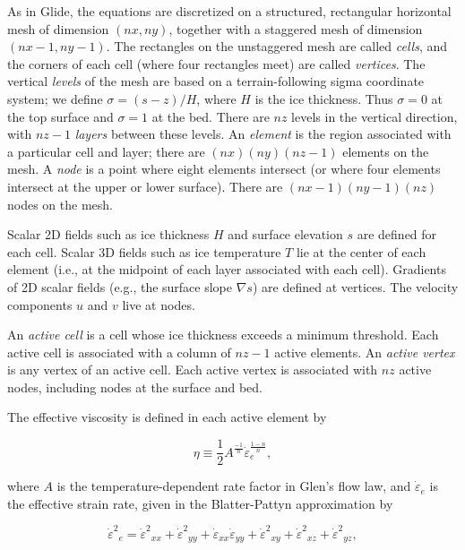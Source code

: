 As in Glide, the equations are discretized on a structured, rectangular horizontal mesh
of dimension $(nx,ny)$, together with a staggered mesh of dimension $(nx-1,ny-1)$.  The rectangles on the unstaggered mesh
are called \textit{cells}, and the corners of each cell (where four rectangles meet) are called \textit{vertices}.
The vertical \textit{levels} of the mesh are based on a terrain-following sigma coordinate system; 
we define $\sigma = (s-z)/H$, where $H$ is the ice thickness. Thus $\sigma = 0$ at the top surface and $\sigma = 1$ at the bed. 
There are $nz$ levels in the vertical direction, with $nz-1$ \textit{layers} between these levels.
An \textit{element} is the region associated with a particular cell and layer; there are
$(nx)(ny)(nz-1)$ elements on the mesh.  A \textit{node} is a point where eight elements intersect (or where four elements
intersect at the upper or lower surface). There are $(nx-1)(ny-1)(nz)$ nodes on the mesh.

Scalar 2D fields such as ice thickness $H$ and surface elevation $s$ are defined for each cell.
Scalar 3D fields such as ice temperature $T$ lie at the center of each element (i.e., at the midpoint of each layer
associated with  each cell). Gradients of 2D scalar fields (e.g., the surface slope $\nabla s$) are defined at vertices.
The velocity components $u$ and $v$ live at nodes.

An \textit{active cell} is a cell whose ice thickness exceeds a minimum threshold.  Each active cell is associated with
a column of $nz-1$ active elements.  An \textit{active vertex} is any vertex of an active cell.  Each active vertex is
associated with $nz$ active nodes, including nodes at the surface and bed.

The effective viscosity is defined in each active element by

\begin{equation}
  \label{gliss.eq.effective_viscosity}
  \eta \equiv \frac{1}{2} A^{\frac{-1}{n}} \dot{\varepsilon }_{e}^{\frac{1-n}{n}},
\end{equation}

\noindent
where $A$ is the temperature-dependent rate factor in Glen's flow law, and $\dot{\varepsilon }_{e}$ is the effective strain rate,
given in the Blatter-Pattyn approximation by 

\begin{equation}
  \label{gliss.eq.effective_strain_rate}
        {{\dot{\varepsilon }}^{2}}_{e}={{\dot{\varepsilon }}^{2}}_{xx}+{{\dot{\varepsilon }}^{2}}_{yy}+{{\dot{\varepsilon }}_{xx}}{{\dot{\varepsilon }}_{yy}}+{{\dot{\varepsilon }}^{2}}_{xy}+{{\dot{\varepsilon }}^{2}}_{xz}+{{\dot{\varepsilon }}^{2}}_{yz},
\end{equation}

